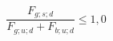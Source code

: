\documentclass[12pt]{article}
\begin{document}
\begin{displaymath}
\frac {F_{g;s;d}} {F_{g;u;d} + F_{b;u;d}} \leq 1,0
\end{displaymath}
\end{document}
